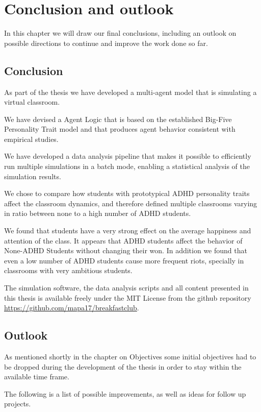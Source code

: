 \chapter{Conclusion and outlook}
In this chapter we will draw our final conclusions, including an outlook on
possible directions to continue and improve the work done so far.

\section{Conclusion}
As part of the thesis we have developed a multi-agent model that is simulating a virtual classroom.

We have devised a Agent Logic that is based on the established Big-Five Personality
Trait model and that produces agent behavior consistent with empirical studies.

We have developed a data analysis pipeline that makes it possible to efficiently
run multiple simulations in a batch mode, enabling a statistical analysis of the
simulation results.

We chose to compare how students with prototypical ADHD personality traits affect
the classroom dynamics, and therefore defined multiple classrooms varying in 
ratio between none to a high number of ADHD students.

We found that students have a very strong effect on the average happiness and attention
of the class. It appears that ADHD students affect the behavior of None-ADHD Students
without changing their won. In addition we found that even a low number of
ADHD students cause more frequent riots, specially in classrooms with very
ambitious students.

The simulation software, the data analysis scripts and all content presented in this
thesis is available freely under the MIT License from the github repository
\href{https://github.com/mapa17/breakfastclub}{https://github.com/mapa17/breakfastclub}.



\section{Outlook}
As mentioned shortly in the chapter on Objectives some initial objectives had to
be dropped during the development of the thesis in order to stay within the available
time frame.

The following is a list of possible improvements, as well as ideas for follow up projects.

